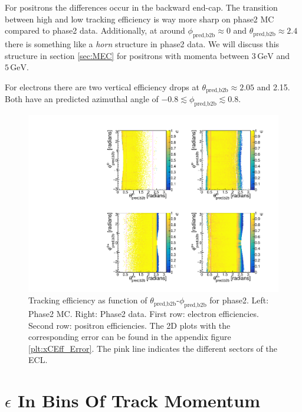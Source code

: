 \documentclass[a4paper,11pt,twosided,final,german,openbib,pdftex,listof=totoc,bibliography=totoc]{scrbook}
\begin{document}
For positrons the differences occur in the backward end-cap. The transition between high and low tracking efficiency is way more sharp on phase2 MC compared to phase2 data. Additionally, at around $\phi_{\textrm{pred,b2b}} \approx 0$ and $\theta_{\textrm{pred,b2b}} \approx 2.4$ there is something like a \textit{horn} structure in phase2 data. We will discuss this structure  in section \ref{sec:MEC} for positrons with momenta between $3\,\textrm{GeV}$ and $5\,\textrm{GeV}$.

For electrons there are two vertical efficiency drops at $\theta_{\textrm{pred,b2b}} \approx 2.05$ and 2.15. Both have an predicted azimuthal angle of $-0.8 \lesssim \phi_{\textrm{pred,b2b}} \lesssim 0.8$.

\begin{figure}[!htbp]
	\centering
	\includegraphics[width=\textwidth]{Plots/master/xCEffTP_MCData.pdf}
	\caption[$\theta_{\textrm{pred,b2b}}$-$\phi_{\textrm{pred,b2b}}$ Efficiency Plots Phase2]{Tracking efficiency as function of $\theta_{\textrm{pred,b2b}}$-$\phi_{\textrm{pred,b2b}}$ for phase2. Left: Phase2 MC. Right: Phase2 data. First row: electron efficiencies. Second row: positron efficiencies. The 2D plots with the corresponding error can be found in the appendix figure \ref{plt:xCEff_Error}. The pink line indicates the different sectors of the ECL.}
	\label{plt:xCEff}
\end{figure}





\clearpage





\section{$\epsilon$ In Bins Of Track Momentum}
\end{document}
